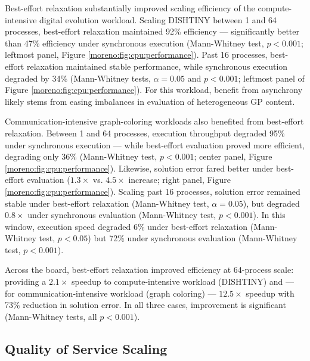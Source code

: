 Best-effort relaxation substantially improved scaling efficiency of the compute-intensive digital evolution workload.
Scaling DISHTINY between 1 and 64 processes, best-effort relaxation maintained 92\% efficiency --- significantly better than 47\% efficiency under synchronous execution (Mann-Whitney test, $p<0.001$; leftmost panel, Figure \ref{moreno:fig:cpu:performance}).
Past 16 processes, best-effort relaxation maintained stable performance, while synchronous execution degraded by 34\% (Mann-Whitney tests, $\alpha = 0.05$ and $p < 0.001$; leftmost panel of Figure \ref{moreno:fig:cpu:performance}).
For this workload, benefit from asynchrony likely stems from easing imbalances in evaluation of heterogeneous GP content.

Communication-intensive graph-coloring workloads also benefited from best-effort relaxation.
Between 1 and 64 processes, execution throughput degraded 95\% under synchronous execution --- while best-effort evaluation proved more efficient, degrading only 36\% (Mann-Whitney test, $p < 0.001$; center panel, Figure \ref{moreno:fig:cpu:performance}).
Likewise, solution error fared better under best-effort evaluation ($1.3\times$ vs. $4.5\times$ increase; right panel, Figure \ref{moreno:fig:cpu:performance}).
Scaling past 16 processes, solution error remained stable under best-effort relaxation (Mann-Whitney test, $\alpha = 0.05$), but degraded $0.8\times$ under synchronous evaluation (Mann-Whitney test, $p < 0.001$).
In this window, execution speed degraded 6\% under best-effort relaxation (Mann-Whitney test, $p < 0.05$) but 72\% under synchronous evaluation (Mann-Whitney test, $p < 0.001$).

Across the board, best-effort relaxation improved efficiency at 64-process scale: providing a $2.1\times$ speedup to compute-intensive workload (DISHTINY) and --- for communication-intensive workload (graph coloring) --- $12.5\times$ speedup with 73\% reduction in solution error.
In all three cases, improvement is significant (Mann-Whitney tests, all $p < 0.001$).

\vspace{-4.0ex}
\subsection{Quality of Service Scaling}
\label{moreno:sec:case1:qos-scaling}
\vspace{-2.0ex}

